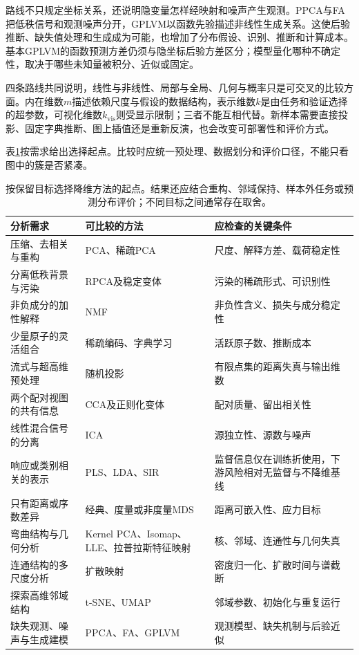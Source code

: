 路线不只规定坐标关系，还说明隐变量怎样经映射和噪声产生观测。PPCA与FA把低秩信号和观测噪声分开，GPLVM以函数先验描述非线性生成关系。这使后验推断、缺失值处理和生成成为可能，也增加了分布假设、识别、推断和计算成本。基本GPLVM的函数预测方差仍须与隐坐标后验方差区分；模型量化哪种不确定性，取决于哪些未知量被积分、近似或固定。

四条路线共同说明，线性与非线性、局部与全局、几何与概率只是可交叉的比较方面。内在维数$m$描述依赖尺度与假设的数据结构，表示维数$k$是由任务和验证选择的超参数，可视化维数$k_{\mathrm{vis}}$则受显示限制；三者不能互相代替。新样本需要直接投影、固定字典推断、图上插值还是重新反演，也会改变可部署性和评价方式。

表\ref{tab:dim-selection}按需求给出选择起点。比较时应统一预处理、数据划分和评价口径，不能只看图中的簇是否紧凑。

\begin{table}[!ht]
  \centering
  \small
  \begin{tabularx}{\linewidth}{@{}XXX@{}}
    \toprule
    分析需求 & 可比较的方法 & 应检查的关键条件\\
    \midrule
    压缩、去相关与重构 & PCA、稀疏PCA & 尺度、解释方差、载荷稳定性\\
    分离低秩背景与污染 & RPCA及稳定变体 & 污染的稀疏形式、可识别性\\
    非负成分的加性解释 & NMF & 非负性含义、损失与成分稳定性\\
    少量原子的灵活组合 & 稀疏编码、字典学习 & 活跃原子数、推断成本\\
    流式与超高维预处理 & 随机投影 & 有限点集的距离失真与输出维数\\
    两个配对视图的共有信息 & CCA及正则化变体 & 配对质量、留出相关性\\
    线性混合信号的分离 & ICA & 源独立性、源数与噪声\\
    响应或类别相关的表示 & PLS、LDA、SIR & 监督信息仅在训练折使用，下游风险相对无监督与不降维基线\\
    只有距离或序数差异 & 经典、度量或非度量MDS & 距离可嵌入性、应力目标\\
    弯曲结构与几何分析 & Kernel PCA、Isomap、LLE、拉普拉斯特征映射 & 核、邻域、连通性与几何失真\\
    连通结构的多尺度分析 & 扩散映射 & 密度归一化、扩散时间与谱截断\\
    探索高维邻域结构 & t-SNE、UMAP & 邻域参数、初始化与重复运行\\
    缺失观测、噪声与生成建模 & PPCA、FA、GPLVM & 观测模型、缺失机制与后验近似\\
    \bottomrule
  \end{tabularx}
  \caption{按保留目标选择降维方法的起点。结果还应结合重构、邻域保持、样本外任务或预测分布评价；不同目标之间通常存在取舍。}
  \label{tab:dim-selection}
\end{table}

